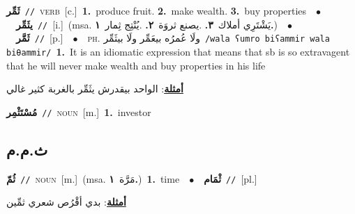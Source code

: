 \documentclass[10pt,a4paper,twoside]{article} %
\begin{document}
\begin{multicols}{2}
{{{{{{{{{{{\setlength\topsep{0pt}\textbf{\foreignlanguage{arabic}{ثَمِّر}}\ {\color{gray}\texttt{//}\color{black}}\ \textsc{verb}\ [c.]\ \textbf{1.}~produce fruit.  \textbf{2.}~make wealth.  \textbf{3.}~buy properties\ \ $\bullet$\ \ \setlength\topsep{0pt}\textbf{\foreignlanguage{arabic}{يثَمِّر}}\ {\color{gray}\texttt{//}\color{black}}\ [i.]\ \color{gray}(msa. \foreignlanguage{arabic}{يَشْتَرِي أملاك}~\foreignlanguage{arabic}{\textbf{٣.}}  .\foreignlanguage{arabic}{يصنع ثروَة}~\foreignlanguage{arabic}{\textbf{٢.}}  .\foreignlanguage{arabic}{يُنْتِج ثِمار}~\foreignlanguage{arabic}{\textbf{١.}})\color{black}\ \ $\bullet$\ \ \setlength\topsep{0pt}\textbf{\foreignlanguage{arabic}{ثَمَّر}}\ {\color{gray}\texttt{//}\color{black}}\ [p.]\ \ $\bullet$\ \ \textsc{ph.} \color{gray} \foreignlanguage{arabic}{ولَا عُمرُه بيعَمِّر ولَا بيثَمِّر}\color{black}\ {\color{gray}\texttt{/{\sffamily wala ʕumro biʕammir wala biθammir}/}\color{black}}\ \textbf{1.}~It is an idiomatic expression that means that sb is so extravagent that he will never make wealth and buy properties in his life\  \begin{flushright}\color{gray}\foreignlanguage{arabic}{\textbf{\underline{\foreignlanguage{arabic}{أمثلة}}}: الواحد بيقدرش يثَمِّر بالغربة كثير غالي}\end{flushright}\color{black}} \vspace{2mm}

{\setlength\topsep{0pt}\textbf{\foreignlanguage{arabic}{مُسْتَثْمِر}}\ {\color{gray}\texttt{//}\color{black}}\ \textsc{noun}\ [m.]\ \textbf{1.}~investor\ 

\vspace{-3mm}
\subsection*{\color{blue}\foreignlanguage{arabic}{ث.م.م}\color{blue}{}} 

{\setlength\topsep{0pt}\textbf{\foreignlanguage{arabic}{ثُمّ}}\ {\color{gray}\texttt{//}\color{black}}\ \textsc{noun}\ [m.]\ \color{gray}(msa. \foreignlanguage{arabic}{مَرَّة}~\foreignlanguage{arabic}{\textbf{١.}})\color{black}\ \textbf{1.}~time\ \ $\bullet$\ \ \setlength\topsep{0pt}\textbf{\foreignlanguage{arabic}{ثْمَام}}\ {\color{gray}\texttt{//}\color{black}}\ [pl.]\  \begin{flushright}\color{gray}\foreignlanguage{arabic}{\textbf{\underline{\foreignlanguage{arabic}{أمثلة}}}: بدي أقْرُص شعري ثمِّين}\end{flushright}\color{black}} \vspace{2mm}

}}}}}}}}}}}
\end{multicols}
\end{document}

